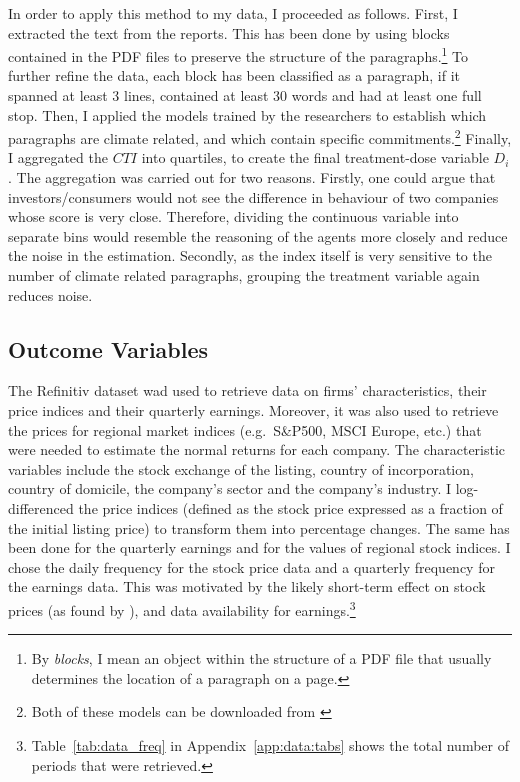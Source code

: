 \documentclass[12pt]{article}
\begin{document}
In order to apply this method to my data, I proceeded as follows. First, I extracted the text from the reports. This has been done by using blocks contained in the PDF files to preserve the structure of the paragraphs.\footnote{By \textit{blocks}, I mean an object within the structure of a PDF file that usually determines the location of a paragraph on a page.} To further refine the data, each block has been classified as a paragraph, if it spanned at least 3 lines, contained at least 30 words and had at least one full stop. Then, I applied the models trained by the researchers to establish which paragraphs are climate related, and which contain specific commitments.\footnote{Both of these models can be downloaded from \href{https://huggingface.co/climatebert}{}} Finally, I aggregated the $CTI$ into quartiles, to create the final treatment-dose variable $D_i$. The aggregation was carried out for two reasons. Firstly, one could argue that investors/consumers would not see the difference in behaviour of two companies whose score is very close. Therefore, dividing the continuous variable into separate bins would resemble the reasoning of the agents more closely and reduce the noise in the estimation. Secondly, as the index itself is very sensitive to the number of climate related paragraphs, grouping the treatment variable again reduces noise. 



\subsection{Outcome Variables}

The Refinitiv dataset wad used to retrieve data on firms' characteristics, their price indices and their quarterly earnings. Moreover, it was also used to retrieve the prices for regional market indices (e.g.\ S\&P500, MSCI Europe, etc.) that were needed to estimate the normal returns for each company. The characteristic variables include the stock exchange of the listing, country of incorporation, country of domicile, the company's sector and the company's industry. I log-differenced the price indices (defined as the stock price expressed as a fraction of the initial listing price) to transform them into percentage changes. The same has been done for the quarterly earnings and for the values of regional stock indices. I chose the daily frequency for the stock price data and a quarterly frequency for the earnings data. This was motivated by the likely short-term effect on stock prices (as found by \textcite{schusterStockPriceReactions2023}), and data availability for earnings.\footnote{Table~\ref{tab:data_freq} in Appendix~\ref{app:data:tabs} shows the total number of periods that were retrieved.}
\end{document}
